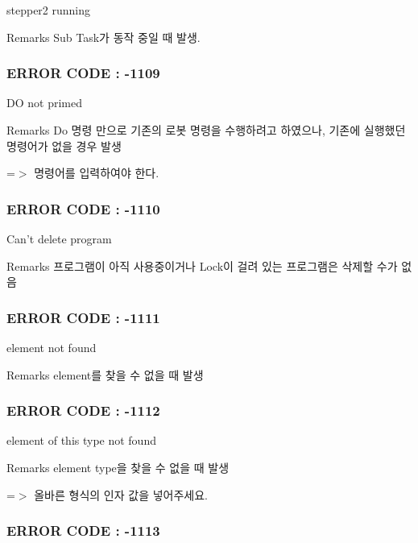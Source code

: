 stepper2 running \begin{DoxyRemark}{Remarks}
Sub Task가 동작 중일 때 발생. \par

\end{DoxyRemark}


 \subsubsection*{E\-R\-R\-O\-R C\-O\-D\-E \-: -\/1109 }

D\-O not primed \begin{DoxyRemark}{Remarks}
Do 명령 만으로 기존의 로봇 명령을 수행하려고 하였으나, 기존에 실행했던 명령어가 없을 경우 발생 \par
 =$>$ 명령어를 입력하여야 한다.
\end{DoxyRemark}


 \subsubsection*{E\-R\-R\-O\-R C\-O\-D\-E \-: -\/1110 }

Can't delete program \begin{DoxyRemark}{Remarks}
프로그램이 아직 사용중이거나 Lock이 걸려 있는 프로그램은 삭제할 수가 없음
\end{DoxyRemark}


 \subsubsection*{E\-R\-R\-O\-R C\-O\-D\-E \-: -\/1111 }

element not found \begin{DoxyRemark}{Remarks}
element를 찾을 수 없을 때 발생 \par

\end{DoxyRemark}


 \subsubsection*{E\-R\-R\-O\-R C\-O\-D\-E \-: -\/1112 }

element of this type not found \begin{DoxyRemark}{Remarks}
element type을 찾을 수 없을 때 발생 \par
 =$>$ 올바른 형식의 인자 값을 넣어주세요.
\end{DoxyRemark}


 \subsubsection*{E\-R\-R\-O\-R C\-O\-D\-E \-: -\/1113 }

